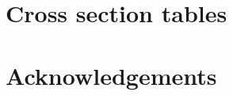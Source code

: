 \documentclass[12pt,a4paper,reqno,twoside,final]{scrbook}%
\numberwithin{equation}{subsection}
\begin{document}
\chapter{Cross section tables}
\label{ch:cstables}




%
%
%
%
%
%
%



\chapter*{Acknowledgements}

\end{document}
